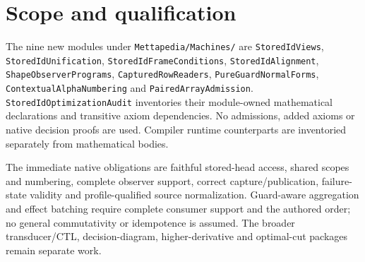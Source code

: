 \documentclass[11pt,a4paper]{article}
\newcommand{\code}[1]{\nolinkurl{#1}}
\begin{document}
\section{Scope and qualification}

The nine new modules under \code{Mettapedia/Machines/} are
\code{StoredIdViews}, \code{StoredIdUnification},
\code{StoredIdFrameConditions}, \code{StoredIdAlignment},
\code{ShapeObserverPrograms}, \code{CapturedRowReaders},
\code{PureGuardNormalForms}, \code{ContextualAlphaNumbering} and
\code{PairedArrayAdmission}. \code{StoredIdOptimizationAudit} inventories their
module-owned mathematical declarations and transitive axiom dependencies.
No admissions, added axioms or native decision proofs are used. Compiler
runtime counterparts are inventoried separately from mathematical bodies.

The immediate native obligations are faithful stored-head access, shared
scopes and numbering, complete observer support, correct capture/publication,
failure-state validity and profile-qualified source normalization. Guard-aware
aggregation and effect batching require complete consumer support and the
authored order; no general commutativity or idempotence is assumed. The broader
transducer/CTL, decision-diagram, higher-derivative and optimal-cut packages
remain separate work.
\end{document}
